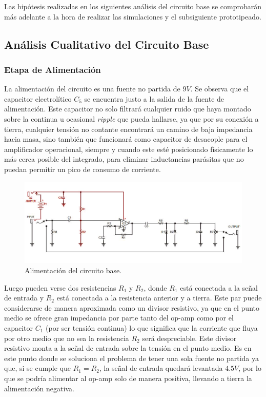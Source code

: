 



Las hipótesis realizadas en los siguientes análisis del circuito base se comprobarán más adelante a la hora de realizar las simulaciones y el subsiguiente prototipeado.

\subsection{Análisis Cualitativo del Circuito Base}

\subsubsection{Etapa de Alimentación}

La alimentación del circuito es una fuente no partida de $9V$. Se observa que el capacitor electrolítico $C_5$ se encuentra justo a la salida de la fuente de alimentación. Este capacitor no solo filtrará cualquier ruido que haya montado sobre la continua u ocasional \textit{ripple} que pueda hallarse, ya que por su conexión a tierra, cualquier tensión no contante encontrará un camino de baja impedancia hacia masa, sino también que funcionará como capacitor de desacople para el amplificador operacional, siempre y cuando este esté posicionado físicamente lo más cerca posible del integrado, para eliminar inductancias parásitas que no puedan permitir un pico de consumo de corriente.

\begin{figure}[H]
	\centering
	\includegraphics[width=1\textwidth, trim={0 0 0 0}, clip]{Ejercicio5/Imagenes/Circuito_base/circuito_base_alimentacion.png}
	\caption{Alimentación del circuito base.}
	\label{fig:circuito_base_alimentacion}
\end{figure}

Luego pueden verse dos resistencias $R_1$ y $R_2$, donde $R_1$ está conectada a la señal de entrada y $R_2$ está conectada a la resistencia anterior y a tierra. Este par puede considerarse de manera aproximada como un divisor resistivo, ya que en el punto medio se ofrece gran impedancia por parte tanto del op-amp como por el capacitor $C_1$ (por ser tensión continua) lo que significa que la corriente que fluya por otro medio que no sea la resistencia $R_2$ será despreciable.
Este divisor resistivo monta a la señal de entrada sobre la tensión en el punto medio. Es en este punto donde se soluciona el problema de tener una sola fuente no partida ya que, si se cumple que $R_1=R_2$, la señal de entrada quedará levantada $4.5V$, por lo que se podría alimentar al op-amp solo de manera positiva, llevando a tierra la alimentación negativa.\\


